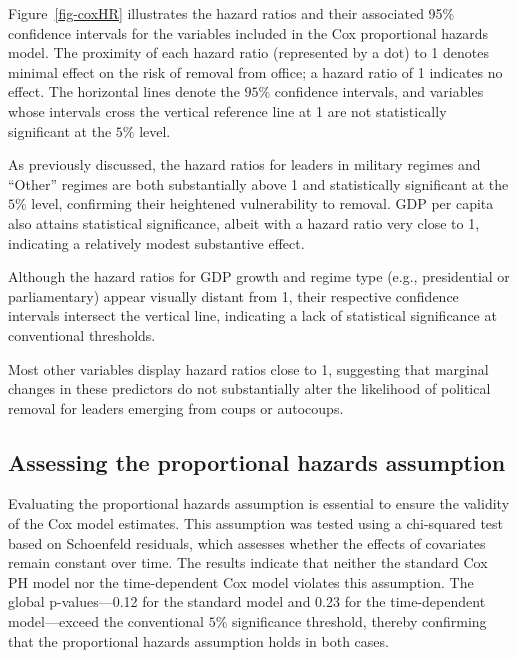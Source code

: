 \documentclass[
  12pt,
]{report}
\begin{document}
Figure~\ref{fig-coxHR} illustrates the hazard ratios and their
associated 95\% confidence intervals for the variables included in the
Cox proportional hazards model. The proximity of each hazard ratio
(represented by a dot) to 1 denotes minimal effect on the risk of
removal from office; a hazard ratio of 1 indicates no effect. The
horizontal lines denote the \(95\%\) confidence intervals, and variables
whose intervals cross the vertical reference line at 1 are not
statistically significant at the \(5\%\) level.

As previously discussed, the hazard ratios for leaders in military
regimes and ``Other'' regimes are both substantially above 1 and
statistically significant at the \(5\%\) level, confirming their
heightened vulnerability to removal. GDP per capita also attains
statistical significance, albeit with a hazard ratio very close to 1,
indicating a relatively modest substantive effect.

Although the hazard ratios for GDP growth and regime type (e.g.,
presidential or parliamentary) appear visually distant from 1, their
respective confidence intervals intersect the vertical line, indicating
a lack of statistical significance at conventional thresholds.

Most other variables display hazard ratios close to 1, suggesting that
marginal changes in these predictors do not substantially alter the
likelihood of political removal for leaders emerging from coups or
autocoups.

\subsection*{Assessing the proportional hazards
assumption}\label{assessing-the-proportional-hazards-assumption}

Evaluating the proportional hazards assumption is essential to ensure
the validity of the Cox model estimates. This assumption was tested
using a chi-squared test based on Schoenfeld residuals, which assesses
whether the effects of covariates remain constant over time. The results
indicate that neither the standard Cox PH model nor the time-dependent
Cox model violates this assumption. The global p-values---0.12 for the
standard model and 0.23 for the time-dependent model---exceed the
conventional \(5\%\) significance threshold, thereby confirming that the
proportional hazards assumption holds in both cases.
\end{document}

